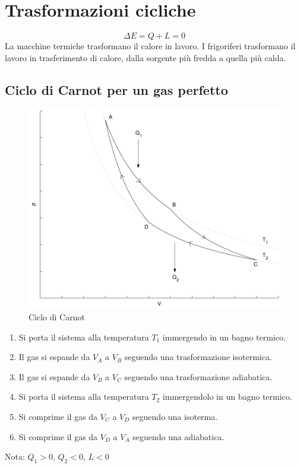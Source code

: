 \section{Trasformazioni cicliche}
\begin{equation}
\Delta E=Q+L=0
\end{equation}
La macchine termiche trasformano il calore in lavoro. I frigoriferi trasformano il lavoro in trasferimento di calore, dalla sorgente più fredda a quella più calda.
\subsection{Ciclo di Carnot per un gas perfetto}
\begin{figure}[htbp]
\centering
\includegraphics[scale=0.5]{immagini/fisica1/Carnot}
\caption{Ciclo di Carnot}
\end{figure}
\parbox[]{\textwidth}{
\begin{enumerate}
\item Si porta il sistema alla temperatura $T_1$ immergendo in un bagno termico.
\item Il gas si espande da $V_A$ a $V_B$ seguendo una trasformazione isotermica.
\item Il gas si espande da $V_B$ a $V_C$ seguendo una trasformazione adiabatica.
\item Si porta il sistema alla temperatura $T_2$ immergendolo in un bagno termico.
\item Si comprime il gas da $V_C$ a $V_D$ seguendo una isoterma.
\item Si comprime il gas da $V_D$ a $V_A$ seguendo una adiabatica.
\end{enumerate}}
Nota: $Q_1>0$, $Q_2<0$, $L<0$

